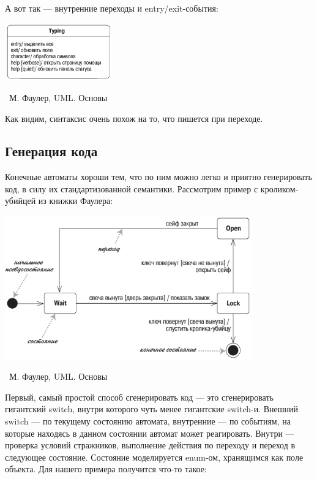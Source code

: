 \documentclass[a5paper]{article}
\newcommand{\attribution}[1] {
	\vspace{-5mm}\begin{flushright}\begin{scriptsize}%
	{\textcopyright\, #1}\end{scriptsize}\end{flushright}
}
\begin{document}
А вот так --- внутренние переходы и entry/exit-события:

\begin{center}
	\includegraphics[width=0.35\textwidth]{stateTransitionInternalEvents.png}
	\attribution{М. Фаулер, UML. Основы}
\end{center}

Как видим, синтаксис очень похож на то, что пишется при переходе.

\subsection{Генерация кода}

Конечные автоматы хороши тем, что по ним можно легко и приятно генерировать код, в силу их стандартизованной семантики. Рассмотрим пример с кроликом-убийцей из книжки Фаулера:

\begin{center}
	\includegraphics[width=0.8\textwidth]{stateTransitionSyntax.png}
	\attribution{М. Фаулер, UML. Основы}
\end{center}

Первый, самый простой способ сгенерировать код --- это сгенерировать гигантский switch, внутри которого чуть менее гигантские switch-и. Внешний switch --- по текущему состоянию автомата, внутренние --- по событиям, на которые находясь в данном состоянии автомат может реагировать. Внутри --- проверка условий стражников, выполнение действия по переходу и переход в следующее состояние. Состояние моделируется enum-ом, хранящимся как поле объекта. Для нашего примера получится что-то такое:
\end{document}
